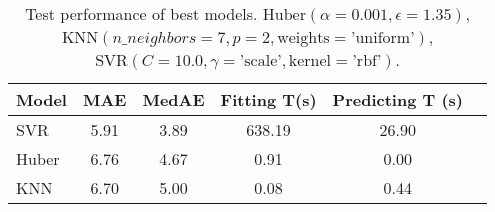 \begin{table}
    \centering
    \caption{Test performance of best models. $ \text{Huber}(\alpha=0.001, \epsilon=1.35)$, $ \text{KNN}(n\_neighbors=7, p=2, \text{weights}=\text{'uniform'})$, $ \text{SVR}(C=10.0, \gamma=\text{'scale'}, \text{kernel}=\text{'rbf'})$.}
    \label{tab:test_performance}
    \begin{tabular}{|l|c|c|c|c|c|}
    \toprule
    Model & MAE & MedAE & Fitting T(s) & Predicting T (s) \\
    \midrule
    SVR & 5.91 & 3.89 & 638.19 & 26.90 \\
    Huber & 6.76 & 4.67 & 0.91 & 0.00 \\
    KNN & 6.70 & 5.00 & 0.08 & 0.44 \\
    \bottomrule
    \end{tabular}
\end{table}